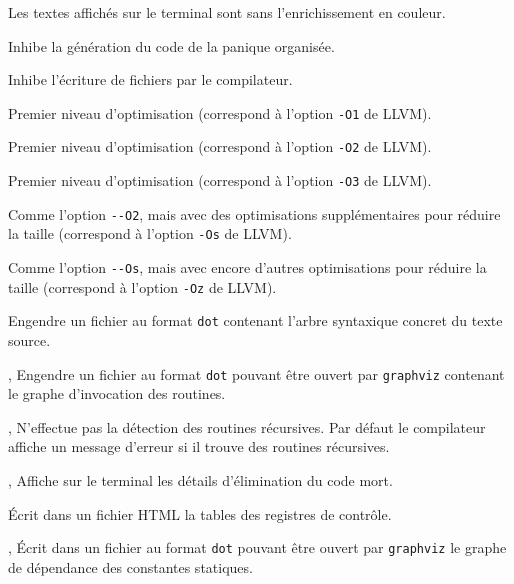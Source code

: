  Les textes affichés sur le terminal sont sans l'enrichissement en couleur.









 Inhibe la génération du code de la panique organisée.


 Inhibe l'écriture de fichiers par le compilateur.

 Premier niveau d'optimisation (correspond à l'option \texttt{-O1} de LLVM).

 Premier niveau d'optimisation (correspond à l'option \texttt{-O2} de LLVM).

 Premier niveau d'optimisation (correspond à l'option \texttt{-O3} de LLVM).

 Comme l'option \texttt{-{}-O2}, mais avec des optimisations supplémentaires pour réduire la taille (correspond à l'option \texttt{-Os} de LLVM).

 Comme l'option \texttt{-{}-Os}, mais avec encore d'autres optimisations pour réduire la taille (correspond à l'option \texttt{-Oz} de LLVM).




 Engendre un fichier au format \texttt{dot} contenant l'arbre syntaxique concret du texte source.

,  Engendre un fichier au format \texttt{dot} pouvant être ouvert par \texttt{graphviz} contenant le graphe d'invocation des routines.

,  N'effectue pas la détection des routines récursives. Par défaut le compilateur affiche un message d'erreur si il trouve des routines récursives.

,  Affiche sur le terminal les détails d'élimination du code mort.

 Écrit dans un fichier HTML la tables des registres de contrôle.

,  Écrit dans un fichier au format \texttt{dot}  pouvant être ouvert par \texttt{graphviz} le graphe de dépendance des constantes statiques.

